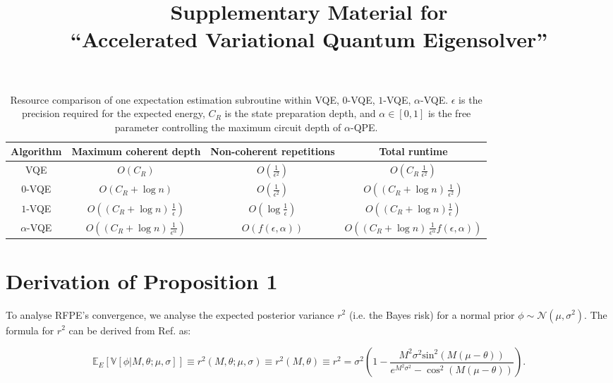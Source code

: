 \documentclass[twocolumn,
 reprint,
 amsmath,amssymb,
 aps,
 floatfix,
superscriptaddress
]{revtex4-1}
\begin{document}
\begin{table*}
\begin{centering}
\begin{tabular}[b]{c|c|c|c}
\multirow{1}{*}{Algorithm} & Maximum coherent depth & Non-coherent repetitions & Total runtime\tabularnewline
\hline 
VQE & $O(C_{R})$ & $O(\frac{1}{\epsilon^{2}})$ & $O(C_{R}\,\frac{1}{\epsilon^{2}})$\tabularnewline

$0$-VQE & $O(C_{R}+\log{n})$ & $O(\frac{1}{\epsilon^{2}})$ & $O((C_{R}+\log{n})\,\frac{1}{\epsilon^{2}})$\tabularnewline

$1$-VQE  & $O((C_{R}+\log{n})\,\frac{1}{\epsilon})$ & $O(\log\frac{1}{\epsilon})$ & $O((C_{R}+\log{n})\frac{1}{\epsilon})$\tabularnewline

$\alpha$-VQE & $O((C_{R}+\log{n})\,\frac{1}{\epsilon^{\alpha}})$ & $O(f(\epsilon,\alpha))$ & {$O((C_{R}+\log{n})\,\frac{1}{\epsilon^{\alpha}}f(\epsilon,\alpha))$}
\end{tabular}
\par\end{centering}
\caption{{\scriptsize{}Resource comparison of one expectation estimation subroutine within VQE, $0$-VQE, $1$-VQE, $\alpha$-VQE. $\epsilon$ is the precision required for the expected energy, $C_{R}$ is the state preparation depth, and $\alpha\in[0,1]$ is the free
parameter controlling the maximum circuit depth of $\alpha$-QPE.}}
\label{Resource table}
\end{table*}
\FloatBarrier


\FloatBarrier
\newpage
\appendix
\title{Supplementary Material for\\
``Accelerated Variational Quantum Eigensolver''}
\onecolumngrid
\vspace{-1cm}
\section{Derivation of Proposition 1}\label{subsec:Derivation of Proposition 1}

To analyse RFPE's convergence, we analyse the expected posterior variance $r^{2}$ (i.e. the Bayes
risk) for a normal prior $\phi\sim\mathcal{N}(\mu,\sigma^{2})$. The formula for $r^2$ can be derived from Ref. \cite[Appendix B]{Ferrie2013} as:

\begin{equation}\label{eq:9}
\mathbb{E}_{E}[\mathbb{V}[\phi|M,\theta;\mu,\sigma]]\equiv r^{2}(M,\theta;\mu,\sigma)\equiv r^{2}(M,\theta)\equiv r^{2}=\sigma^{2}(1-\frac{M^{2}\sigma^{2}\text{sin}^{2}(M(\mu-\theta))}{e^{M^{2}\sigma^{2}}-\cos^{2}(M(\mu-\theta))}).
\end{equation}
\end{document}
